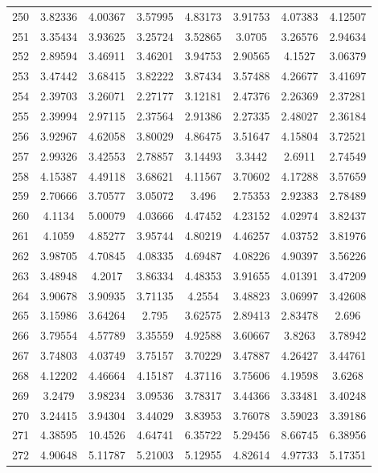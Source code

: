 \begin{center}
\begin{longtable}{cccccccc}
250 & 3.82336 & 4.00367 & 3.57995 & 4.83173 & 3.91753 & 4.07383 & 4.12507\\
251 & 3.35434 & 3.93625 & 3.25724 & 3.52865 & 3.0705 & 3.26576 & 2.94634\\
252 & 2.89594 & 3.46911 & 3.46201 & 3.94753 & 2.90565 & 4.1527 & 3.06379\\
253 & 3.47442 & 3.68415 & 3.82222 & 3.87434 & 3.57488 & 4.26677 & 3.41697\\
254 & 2.39703 & 3.26071 & 2.27177 & 3.12181 & 2.47376 & 2.26369 & 2.37281\\
255 & 2.39994 & 2.97115 & 2.37564 & 2.91386 & 2.27335 & 2.48027 & 2.36184\\
256 & 3.92967 & 4.62058 & 3.80029 & 4.86475 & 3.51647 & 4.15804 & 3.72521\\
257 & 2.99326 & 3.42553 & 2.78857 & 3.14493 & 3.3442 & 2.6911 & 2.74549\\
258 & 4.15387 & 4.49118 & 3.68621 & 4.11567 & 3.70602 & 4.17288 & 3.57659\\
259 & 2.70666 & 3.70577 & 3.05072 & 3.496 & 2.75353 & 2.92383 & 2.78489\\
260 & 4.1134 & 5.00079 & 4.03666 & 4.47452 & 4.23152 & 4.02974 & 3.82437\\
261 & 4.1059 & 4.85277 & 3.95744 & 4.80219 & 4.46257 & 4.03752 & 3.81976\\
262 & 3.98705 & 4.70845 & 4.08335 & 4.69487 & 4.08226 & 4.90397 & 3.56226\\
263 & 3.48948 & 4.2017 & 3.86334 & 4.48353 & 3.91655 & 4.01391 & 3.47209\\
264 & 3.90678 & 3.90935 & 3.71135 & 4.2554 & 3.48823 & 3.06997 & 3.42608\\
265 & 3.15986 & 3.64264 & 2.795 & 3.62575 & 2.89413 & 2.83478 & 2.696\\
266 & 3.79554 & 4.57789 & 3.35559 & 4.92588 & 3.60667 & 3.8263 & 3.78942\\
267 & 3.74803 & 4.03749 & 3.75157 & 3.70229 & 3.47887 & 4.26427 & 3.44761\\
268 & 4.12202 & 4.46664 & 4.15187 & 4.37116 & 3.75606 & 4.19598 & 3.6268\\
269 & 3.2479 & 3.98234 & 3.09536 & 3.78317 & 3.44366 & 3.33481 & 3.40248\\
270 & 3.24415 & 3.94304 & 3.44029 & 3.83953 & 3.76078 & 3.59023 & 3.39186\\
271 & 4.38595 & 10.4526 & 4.64741 & 6.35722 & 5.29456 & 8.66745 & 6.38956\\
272 & 4.90648 & 5.11787 & 5.21003 & 5.12955 & 4.82614 & 4.97733 & 5.17351\\

\end{longtable}
\end{center}
